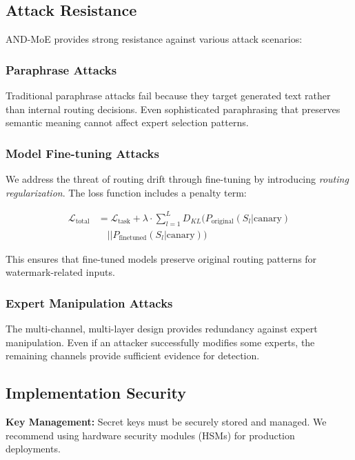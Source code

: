 \documentclass[letterpaper,twocolumn,10pt]{article}
\begin{document}
\subsection{Attack Resistance}

AND-MoE provides strong resistance against various attack scenarios:

\subsubsection{Paraphrase Attacks}

Traditional paraphrase attacks fail because they target generated text rather than internal routing decisions. Even sophisticated paraphrasing that preserves semantic meaning cannot affect expert selection patterns.

\subsubsection{Model Fine-tuning Attacks}

We address the threat of routing drift through fine-tuning by introducing \textit{routing regularization}. The loss function includes a penalty term:

\begin{align}
\mathcal{L}_{\text{total}} &= \mathcal{L}_{\text{task}} + \lambda \cdot \sum_{l=1}^{L} D_{KL}(P_{\text{original}}(S_l|\text{canary}) \\
&\quad || P_{\text{finetuned}}(S_l|\text{canary}))
\end{align}

This ensures that fine-tuned models preserve original routing patterns for watermark-related inputs.

\subsubsection{Expert Manipulation Attacks}

The multi-channel, multi-layer design provides redundancy against expert manipulation. Even if an attacker successfully modifies some experts, the remaining channels provide sufficient evidence for detection.

\subsection{Implementation Security}

\textbf{Key Management:} Secret keys must be securely stored and managed. We recommend using hardware security modules (HSMs) for production deployments.
\end{document}
